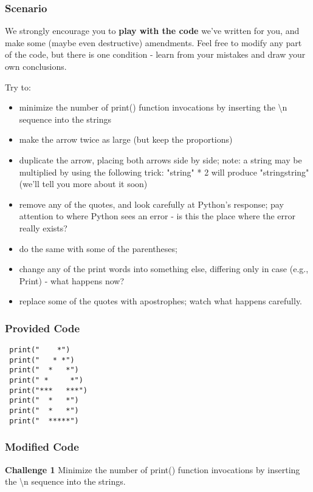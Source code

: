 \documentclass[a4paper,10pt]{article}
\begin{document}
\subsubsection{Scenario}
We strongly encourage you to \textbf{play with the code} we've written for you, and make some (maybe even destructive) amendments. Feel free to modify any part of the code, but there is one condition - learn from your mistakes and draw your own conclusions.
\newline

Try to:
\begin{itemize}
 \item minimize the number of {\selectfont print()} function invocations by inserting the {\selectfont\textbackslash n} sequence into the strings
 \item make the arrow twice as large (but keep the proportions)
 \item duplicate the arrow, placing both arrows side by side; note: a string may be multiplied by using the following trick: {\selectfont "string" * 2} will produce {\selectfont "stringstring"} (we'll tell you more about it soon)
 \item remove any of the quotes, and look carefully at Python's response; pay attention to where Python sees an error - is this the place where the error really exists?
 \item do the same with some of the parentheses;
 \item change any of the {\selectfont print} words into something else, differing only in case (e.g., {\selectfont Print}) - what happens now?
 \item replace some of the quotes with apostrophes; watch what happens carefully.
\end{itemize}

\subsubsection{Provided Code}
\begin{verbatim}
 print("    *")
 print("   * *")
 print("  *   *")
 print(" *     *")
 print("***   ***")
 print("  *   *")
 print("  *   *")
 print("  *****")
\end{verbatim}

\subsubsection{Modified Code}
\textbf{Challenge 1}
Minimize the number of {\selectfont print()} function invocations by inserting the {\selectfont\textbackslash n} sequence into the strings.
\newline
\end{document}
